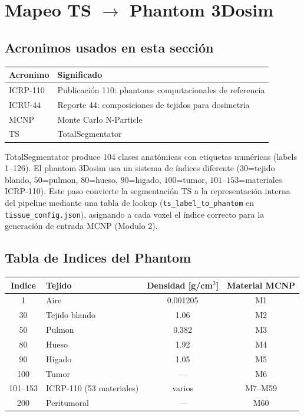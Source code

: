 \documentclass[12pt,a4paper]{article}
\begin{document}
\section{Mapeo TS \texorpdfstring{$\to$}{a} Phantom 3Dosim}
\label{sec:mapeo}

\subsection*{Acronimos usados en esta sección}
\begin{tabular}{ll}
\toprule
\textbf{Acronimo} & \textbf{Significado} \\
\midrule
ICRP-110 & Publicación 110: phantoms computacionales de referencia \\
ICRU-44 & Reporte 44: composiciones de tejidos para dosimetria \\
MCNP & Monte Carlo N-Particle \\
TS & TotalSegmentator \\
\bottomrule
\end{tabular}

TotalSegmentator produce 104 clases anatómicas con etiquetas numéricas (labels 1--126). El
phantom 3Dosim usa un sistema de índices diferente ($30$=tejido blando, $50$=pulmon, $80$=hueso,
$90$=higado, $100$=tumor, $101$--$153$=materiales ICRP-110). Este paso convierte la segmentación
TS a la representación interna del pipeline mediante una tabla de lookup
(\texttt{ts\_label\_to\_phantom} en \texttt{tissue\_config.json}), asignando a cada voxel el
índice correcto para la generación de entrada MCNP (Modulo 2).

\subsection{Tabla de Indices del Phantom}

\begin{table}[H]
\centering
\begin{tabular}{c l c c}
\toprule
\textbf{Indice} & \textbf{Tejido} & \textbf{Densidad [g/cm$^3$]} & \textbf{Material MCNP} \\
\midrule
1 & Aire & 0.001205 & M1 \\
30 & Tejido blando & 1.06 & M2 \\
50 & Pulmon & 0.382 & M3 \\
80 & Hueso & 1.92 & M4 \\
90 & Higado & 1.05 & M5 \\
100 & Tumor & --- & M6 \\
101--153 & ICRP-110 (53 materiales) & varios & M7--M59 \\
200 & Peritumoral & --- & M60 \\
\bottomrule
\end{tabular}
\end{table}
\end{document}
